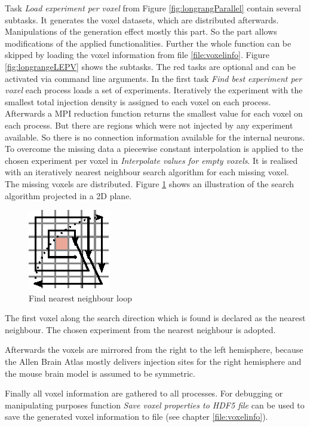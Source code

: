 Task \emph{Load experiment per voxel} from Figure \ref{fig:longrangParallel} contain several subtasks.
It generates the voxel datasets, which are distributed afterwards.
Manipulations of the generation effect mostly this part.
So the part allows modifications of the applied functionalities. 
Further the whole function can be skipped by loading the voxel information from file \ref{file:voxelinfo}.
Figure \ref{fig:longrangeLEPV} shows the subtasks.
The red tasks are optional and can be activated via command line arguments.
In the first task \emph{Find best experiment per voxel} each process loads a set of experiments.
Iteratively the experiment with the smallest total injection density is assigned to each voxel
on each process. Afterwards a MPI reduction function returns the smallest value for each voxel on
each process.
But there are regions which were not injected by any experiment available.
So there is no connection information available for the internal neurons.
To overcome the missing data a piecewise constant interpolation is applied to the chosen experiment per voxel
in \emph{Interpolate values for empty voxels}.
It is realised with an iteratively nearest neighbour search algorithm for each missing voxel.
The missing voxels are distributed.
Figure \ref{longrange} shows an illustration of the search algorithm
projected in a 2D plane.
\begin{figure}[ht!]
\centering
\includegraphics[scale=2.5]{pictures/longRange_Nearest_parallelAlg.eps}
\caption{Find nearest neighbour loop}
\label{longrange}
\end{figure}
The first voxel along the search direction which is found is declared as the nearest neighbour.
The chosen experiment from the nearest neighbour is adopted.

Afterwards the voxels are mirrored from the right to the left hemisphere, because the
Allen Brain Atlas mostly delivers injection sites for the right hemisphere and
the mouse brain model is assumed to be symmetric.

Finally all voxel information are gathered to all processes.
For debugging or manipulating purposes function \emph{Save voxel properties to HDF5 file} can be used
to save the generated voxel information to file (see chapter \ref{file:voxelinfo}).

